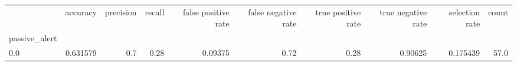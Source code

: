 \begin{tabular}{lrrrrrrrrr}
\toprule
{} &  accuracy &  precision &  recall &  false positive rate &  false negative rate &  true positive rate &  true negative rate &  selection rate &  count \\
passive\_alert &           &            &         &                      &                      &                     &                     &                 &        \\
\midrule
0.0           &  0.631579 &        0.7 &    0.28 &              0.09375 &                 0.72 &                0.28 &             0.90625 &        0.175439 &   57.0 \\
\bottomrule
\end{tabular}
